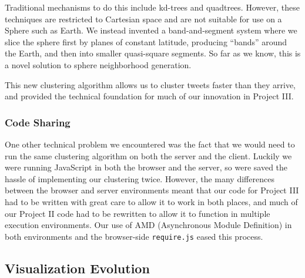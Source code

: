 \documentclass[pdftex,12pt,a4paper]{article}
\begin{document}
Traditional mechanisms to do this include kd-trees and quadtrees. However, these
techniques are restricted to Cartesian space and are not suitable for use on a
Sphere such as Earth. We instead invented a band-and-segment system where we
slice the sphere first by planes of constant latitude, producing ``bands''
around the Earth, and then into smaller quasi-square segments. So far as we
know, this is a novel solution to sphere neighborhood generation.

This new clustering algorithm allows us to cluster tweets faster than they
arrive, and provided the technical foundation for much of our innovation in
Project III.

\subsubsection{Code Sharing}

One other technical problem we encountered was the fact that we would need to
run the same clustering algorithm on both the server and the client. Luckily we
were running JavaScript in both the browser and the server, so were saved the
hassle of implementing our clustering twice. However, the many differences
between the browser and server environments meant that our code for Project III
had to be written with great care to allow it to work in both places, and much
of our Project II code had to be rewritten to allow it to function in multiple
execution environments. Our use of AMD (Asynchronous Module Definition) in both
environments and the browser-side \verb`require.js` eased this process.

\subsection{Visualization Evolution}
\end{document}
